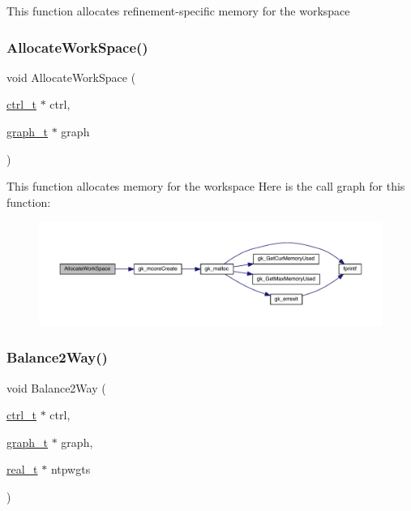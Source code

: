 This function allocates refinement-\/specific memory for the workspace \mbox{\label{a00945_a38986a3bdf3ee614ee37396e8f3c149b}} 
\subsubsection{\texorpdfstring{Allocate\+Work\+Space()}{AllocateWorkSpace()}}
{\footnotesize\ttfamily void Allocate\+Work\+Space (\begin{DoxyParamCaption}\item[{\hyperlink{a00742}{ctrl\+\_\+t} $\ast$}]{ctrl,  }\item[{\hyperlink{a00734}{graph\+\_\+t} $\ast$}]{graph }\end{DoxyParamCaption})}

This function allocates memory for the workspace Here is the call graph for this function\+:\nopagebreak
\begin{figure}[H]
\begin{center}
\leavevmode
\includegraphics[width=350pt]{a00945_a38986a3bdf3ee614ee37396e8f3c149b_cgraph}
\end{center}
\end{figure}
\mbox{\label{a00945_a11bd5be7764194a2bb8d6cfe580a30b8}} 
\subsubsection{\texorpdfstring{Balance2\+Way()}{Balance2Way()}}
{\footnotesize\ttfamily void Balance2\+Way (\begin{DoxyParamCaption}\item[{\hyperlink{a00742}{ctrl\+\_\+t} $\ast$}]{ctrl,  }\item[{\hyperlink{a00734}{graph\+\_\+t} $\ast$}]{graph,  }\item[{\hyperlink{a00876_a1924a4f6907cc3833213aba1f07fcbe9}{real\+\_\+t} $\ast$}]{ntpwgts }\end{DoxyParamCaption})}

